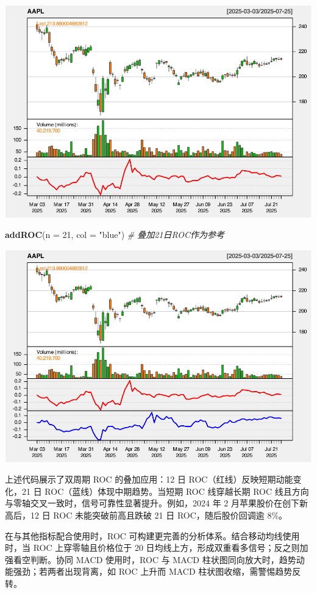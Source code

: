 \documentclass[]{ctexbook}
\newenvironment{Shaded}{\begin{snugshade}}{\end{snugshade}}
\newcommand{\AttributeTok}[1]{\textcolor[rgb]{0.13,0.29,0.53}{#1}}
\newcommand{\CommentTok}[1]{\textcolor[rgb]{0.56,0.35,0.01}{\textit{#1}}}
\newcommand{\DecValTok}[1]{\textcolor[rgb]{0.00,0.00,0.81}{#1}}
\newcommand{\FunctionTok}[1]{\textcolor[rgb]{0.13,0.29,0.53}{\textbf{#1}}}
\newcommand{\NormalTok}[1]{#1}
\newcommand{\StringTok}[1]{\textcolor[rgb]{0.31,0.60,0.02}{#1}}
\begin{document}
\includegraphics[width=0.9\linewidth]{QuantmodHandbook_files/figure-latex/roc-2}

\begin{Shaded}
\begin{Highlighting}[]
\FunctionTok{addROC}\NormalTok{(}\AttributeTok{n =} \DecValTok{21}\NormalTok{, }\AttributeTok{col =} \StringTok{"blue"}\NormalTok{)  }\CommentTok{\# 叠加21日ROC作为参考 }
\end{Highlighting}
\end{Shaded}

\includegraphics[width=0.9\linewidth]{QuantmodHandbook_files/figure-latex/roc-3}

上述代码展示了双周期 ROC 的叠加应用：12 日 ROC（红线）反映短期动能变化，21 日 ROC（蓝线）体现中期趋势。当短期 ROC 线穿越长期 ROC 线且方向与零轴交叉一致时，信号可靠性显著提升。例如，2024 年 2 月苹果股价在创下新高后，12 日 ROC 未能突破前高且跌破 21 日 ROC，随后股价回调逾 8\%。

在与其他指标配合使用时，ROC 可构建更完善的分析体系。结合移动均线使用时，当 ROC 上穿零轴且价格位于 20 日均线上方，形成双重看多信号；反之则加强看空判断。协同 MACD 使用时，ROC 与 MACD 柱状图同向放大时，趋势动能强劲；若两者出现背离，如 ROC 上升而 MACD 柱状图收缩，需警惕趋势反转。
\end{document}
